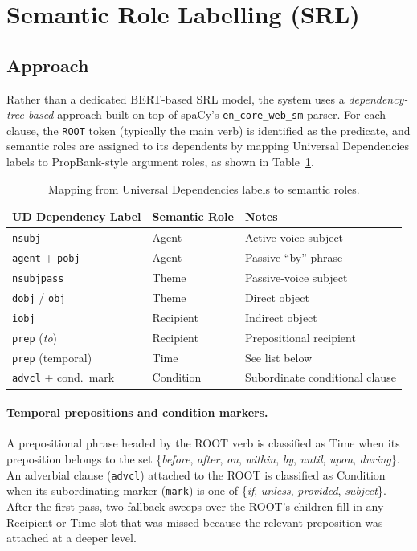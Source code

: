 \documentclass[assignment.tex]{subfiles}
\begin{document}
\section{Semantic Role Labelling (SRL)}
\label{subsec:srl}

\subsection{Approach}

Rather than a dedicated BERT-based SRL model, the system uses a
\emph{dependency-tree-based} approach built on top of spaCy's
\texttt{en\_core\_web\_sm} parser.  For each clause, the \texttt{ROOT} token
(typically the main verb) is identified as the predicate, and semantic roles are
assigned to its dependents by mapping Universal Dependencies labels to
PropBank-style argument roles, as shown in Table~\ref{tab:srl-mapping}.

\begin{table}[H]
    \centering
    \caption{Mapping from Universal Dependencies labels to semantic roles.}
    \label{tab:srl-mapping}
    \begin{tabular}{@{}lll@{}}
        \toprule
        \textbf{UD Dependency Label} & \textbf{Semantic Role} & \textbf{Notes} \\
        \midrule
        \texttt{nsubj}                 & Agent      & Active-voice subject \\
        \texttt{agent} + \texttt{pobj} & Agent      & Passive ``by'' phrase \\
        \texttt{nsubjpass}             & Theme      & Passive-voice subject \\
        \texttt{dobj} / \texttt{obj}   & Theme      & Direct object \\
        \texttt{iobj}                  & Recipient  & Indirect object \\
        \texttt{prep} (\textit{to})    & Recipient  & Prepositional recipient \\
        \texttt{prep} (temporal)       & Time       & See list below \\
        \texttt{advcl} + cond.\ mark   & Condition  & Subordinate conditional clause \\
        \bottomrule
    \end{tabular}
\end{table}

\paragraph{Temporal prepositions and condition markers.}
A prepositional phrase headed by the ROOT verb is classified as Time when its
preposition belongs to the set
\{\textit{before}, \textit{after}, \textit{on}, \textit{within},
\textit{by}, \textit{until}, \textit{upon}, \textit{during}\}.
An adverbial clause (\texttt{advcl}) attached to the ROOT is classified as
Condition when its subordinating marker (\texttt{mark}) is one of
\{\textit{if}, \textit{unless}, \textit{provided}, \textit{subject}\}.
After the first pass, two fallback sweeps over the ROOT's children fill in any
Recipient or Time slot that was missed because the relevant preposition was
attached at a deeper level.
\end{document}
